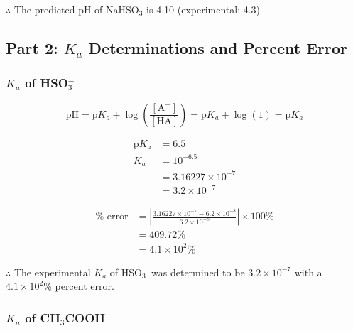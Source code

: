 \documentclass{article}
\begin{document}
\vspace{0.1in}
$\therefore$ The predicted pH of NaHSO$_3$ is 4.10 (experimental: 4.3)

\subsection*{Part 2: $K_a$ Determinations and Percent Error}

\subsubsection*{$K_a$ of HSO$_3^-$}

\begin{equation*}
\text{pH} = \text{p}K_a + \log\left(\frac{[\text{A}^-]}{[\text{HA}]}\right) = \text{p}K_a + \log(1) = \text{p}K_a
\end{equation*}

\noindent
\begin{minipage}[t]{0.45\textwidth}
    \begin{align*}
        \text{p}K_a &= 6.5 \\
        K_a &= 10^{-6.5} \\
        &= 3.16227 \times 10^{-7} \\
        &= 3.2 \times 10^{-7}
    \end{align*}
\end{minipage}
\hfill
\begin{minipage}[t]{0.45\textwidth}
    \begin{align*}
        \% \text{ error} &= \left| \frac{3.16227 \times 10^{-7} - 6.2 \times 10^{-8}}{6.2 \times 10^{-8}} \right| \times 100\% \\
        &= 409.72\% \\
        &= 4.1 \times 10^{2}\%
    \end{align*}
\end{minipage}

\vspace{0.1in}
$\therefore$ The experimental $K_a$ of HSO$_3^-$ was determined to be $3.2 \times 10^{-7}$ with a $4.1 \times 10^{2}\%$ percent error.

\subsubsection*{$K_a$ of CH$_3$COOH}
\end{document}
